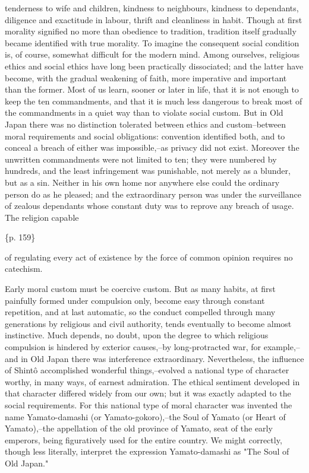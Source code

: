 tenderness to wife and children, kindness to neighbours, kindness to dependants, diligence and exactitude in labour, thrift and cleanliness in habit. Though at first morality signified no more than obedience to tradition, tradition itself gradually became identified with true morality. To imagine the consequent social condition is, of course, somewhat difficult for the modern mind. Among ourselves, religious ethics and social ethics have long been practically dissociated; and the latter have become, with the gradual weakening of faith, more imperative and important than the former. Most of us learn, sooner or later in life, that it is not enough to keep the ten commandments, and that it is much less dangerous to break most of the commandments in a quiet way than to violate social custom. But in Old Japan there was no distinction tolerated between ethics and custom--between moral requirements and social obligations: convention identified both, and to conceal a breach of either was impossible,--as privacy did not exist. Moreover the unwritten commandments were not limited to ten; they were numbered by hundreds, and the least infringement was punishable, not merely as a blunder, but as a sin. Neither in his own home nor anywhere else could the ordinary person do as he pleased; and the extraordinary person was under the surveillance of zealous dependants whose constant duty was to reprove any breach of usage. The religion capable

\{p. 159\}

of regulating every act of existence by the force of common opinion requires no catechism.



Early moral custom must be coercive custom. But as many habits, at first painfully formed under compulsion only, become easy through constant repetition, and at last automatic, so the conduct compelled through many generations by religious and civil authority, tends eventually to become almost instinctive. Much depends, no doubt, upon the degree to which religious compulsion is hindered by exterior causes,--by long-protracted war, for example,--and in Old Japan there was interference extraordinary. Nevertheless, the influence of Shintô accomplished wonderful things,--evolved a national type of character worthy, in many ways, of earnest admiration. The ethical sentiment developed in that character differed widely from our own; but it was exactly adapted to the social requirements. For this national type of moral character was invented the name Yamato-damashi (or Yamato-gokoro),--the Soul of Yamato (or Heart of Yamato),--the appellation of the old province of Yamato, seat of the early emperors, being figuratively used for the entire country. We might correctly, though less literally, interpret the expression Yamato-damashi as "The Soul of Old Japan."

